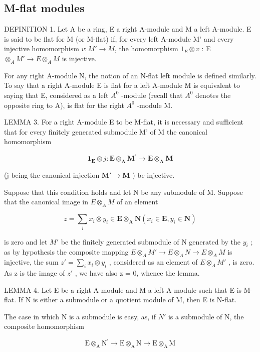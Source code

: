\subsection{M-flat modules}

DEFINITION 1. Let A be a ring, E a right A-module and M a left A-module. E is said to be flat for M (or M-flat) if, for every left A-module M' and every injective homomorphism \(v: M' \to M\), the homomorphism \(1_{E} \otimes v\) : E \(\otimes_{A} M' \to E \otimes_{A} M\) is injective.

For any right A-module N, the notion of an N-flat left module is defined similarly. To say that a right A-module E is flat for a left A-module M is equivalent to saying that E, considered as a left \(A^{0}\) -module (recall that \(A^{0}\) denotes the opposite ring to A), is flat for the right \(A^{0}\) -module M.

LEMMA 3. For a right A-module E to be M-flat, it is necessary and sufficient that for every finitely generated submodule M' of M the canonical homomorphism

\[
\mathbf {1} _ {\mathbf {E}} \otimes j: \mathbf {E} \otimes_ {\mathbf {A}} \mathbf {M} ^ {\prime} \rightarrow \mathbf {E} \otimes_ {\mathbf {A}} \mathbf {M}
\]

(j being the canonical injection \(\mathbf{M}'\to \mathbf{M}\) ) be injective.

Suppose that this condition holds and let N be any submodule of M. Suppose that the canonical image in \(E \otimes_{A} M\) of an element

\[
z = \sum_ {i} x _ {i} \otimes y _ {i} \in \mathbf {E} \otimes_ {\mathbf {A}} \mathbf {N} (x _ {i} \in \mathbf {E}, y _ {i} \in \mathbf {N})
\]

is zero and let \(M'\) be the finitely generated submodule of N generated by the \(y_{i}\) ; as by hypothesis the composite mapping \(E \otimes_{A} M' \to E \otimes_{A} N \to E \otimes_{A} M\) is injective, the sum \(z' = \sum_{i} x_{i} \otimes y_{i}\) , considered as an element of \(E \otimes_{A} M'\) , is zero. As z is the image of \(z'\) , we have also z = 0, whence the lemma.

LEMMA 4. Let E be a right A-module and M a left A-module such that E is M-flat. If N is either a submodule or a quotient module of M, then E is N-flat.

The case in which N is a submodule is easy, as, if \(N'\) is a submodule of N, the composite homomorphism

\[
\mathrm{E} \otimes_ {\mathrm{A}} \mathrm{N} ^ {\prime} \rightarrow \mathrm{E} \otimes_ {\mathrm{A}} \mathrm{N} \rightarrow \mathrm{E} \otimes_ {\mathrm{A}} \mathrm{M}
\]

